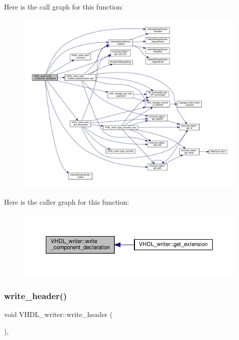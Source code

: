 Here is the call graph for this function\+:
\nopagebreak
\begin{figure}[H]
\begin{center}
\leavevmode
\includegraphics[width=350pt]{d0/d0c/structVHDL__writer_a34dbb60f7e32cdaab7b617f5cb5d9943_cgraph}
\end{center}
\end{figure}
Here is the caller graph for this function\+:
\nopagebreak
\begin{figure}[H]
\begin{center}
\leavevmode
\includegraphics[width=350pt]{d0/d0c/structVHDL__writer_a34dbb60f7e32cdaab7b617f5cb5d9943_icgraph}
\end{center}
\end{figure}
\mbox{\label{structVHDL__writer_aae8bd96734b2cf29299f86ec53cfde3c}} 
\subsubsection{\texorpdfstring{write\+\_\+header()}{write\_header()}}
{\footnotesize\ttfamily void V\+H\+D\+L\+\_\+writer\+::write\+\_\+header (\begin{DoxyParamCaption}{ }\end{DoxyParamCaption})\hspace{0.3cm}{\ttfamily [override]}, {\ttfamily [virtual]}}



